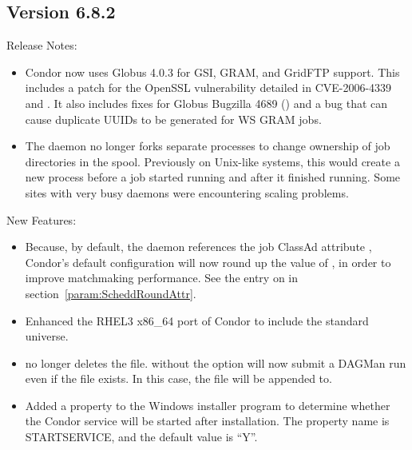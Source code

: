 \subsection*{\label{sec:New-6-8-2}Version 6.8.2}

\noindent Release Notes:

\begin{itemize}

\item Condor now uses Globus 4.0.3 for GSI, GRAM, and GridFTP support.
This includes a patch for the OpenSSL vulnerability detailed in 
CVE-2006-4339 and .
It also includes fixes for Globus Bugzilla 4689 
() and a 
bug that can cause duplicate UUIDs to be generated for WS GRAM jobs.

\item The  daemon no longer forks separate processes to 
change ownership of job directories in the spool.
Previously on Unix-like systems, this would create a
new process before a job started running and after it finished running.   Some
sites with very busy  daemons were encountering scaling problems.

\end{itemize}

\noindent New Features:

\begin{itemize}

\item Because, by default, the  daemon references the job
ClassAd attribute , Condor's default configuration
will now round up the value of , in order to improve 
matchmaking performance.  See the entry on 
in section~\ref{param:ScheddRoundAttr}.

\item Enhanced the RHEL3 x86\_64 port of Condor to include the standard
universe.

\item {}  no longer deletes the
 file.   without the 
option will now submit a DAGMan run even if the 
file exists.  In this case, the file will be appended to.

\item Added a property to the Windows installer program to determine
whether the Condor service will be started after installation. The
property name is STARTSERVICE, and the default value is ``Y''.

\end{itemize}

